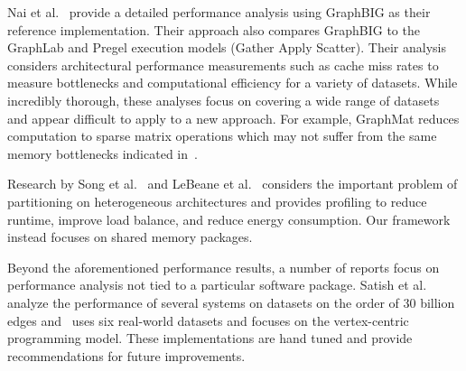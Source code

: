 \documentclass[conference]{IEEEtran}
\begin{document}
Nai et al.~\cite{Nai:2016:architectural} provide a detailed performance analysis using GraphBIG as their reference implementation. Their approach also compares GraphBIG to the GraphLab and Pregel execution models (Gather Apply Scatter). Their analysis considers architectural performance measurements such as cache miss rates to measure bottlenecks and computational efficiency for a variety of datasets. While incredibly thorough, these analyses focus on covering a wide range of datasets and appear difficult to apply to a new approach. For example, GraphMat reduces computation to sparse matrix operations which may not suffer from the same memory bottlenecks indicated in~\cite{Nai:2016:architectural}.

Research by Song et al.~\cite{Song:2016:LoadBalancing} and LeBeane et al.~\cite{LeBeane:2015:GraphHetero} considers the important problem of partitioning on heterogeneous architectures and provides profiling to reduce runtime, improve load balance, and reduce energy consumption.  Our framework instead focuses on shared memory packages. 

Beyond the aforementioned performance results, a number of reports focus on performance analysis not tied to a particular software package. Satish et al.~\mbox{\cite{Satish:2014:NavigatingGraph}} analyze the performance of several systems on datasets on the order of $30$ billion edges and~\cite{Lu:2014:ExperimentalEval} uses six real-world datasets and focuses on the vertex-centric programming model. These implementations are hand tuned and provide recommendations for future improvements.
\end{document}
